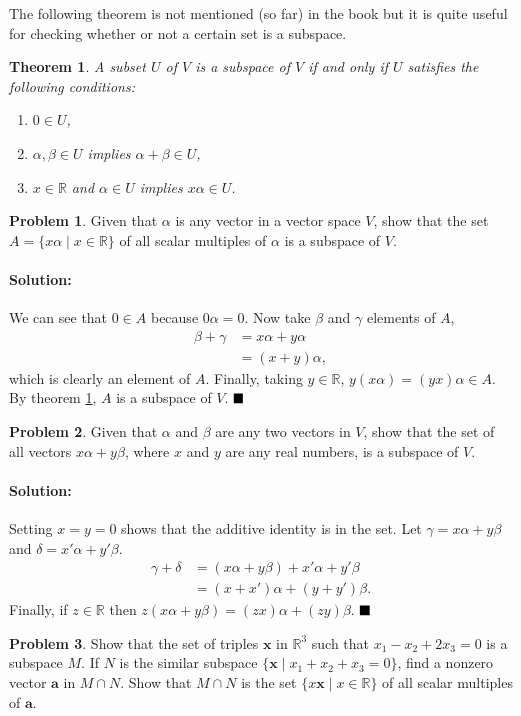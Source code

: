 \documentclass[]{article}
\newcommand{\RR}{\mathbb{R}}
\newtheorem{theorem}{Theorem}[section]
\theoremstyle{definition}
\newtheorem{problem}{Problem}
\newenvironment{solution}{\paragraph{Solution:}}{\hfill$\blacksquare \\$}
\begin{document}
The following theorem is not mentioned (so far) in the book but it is quite useful for checking whether or not a certain set is a subspace.
\begin{theorem}\label{subspace:1}
	A subset $U$ of $V$ is a subspace of $V$ if and only if $U$ satisfies the following conditions:
	\begin{enumerate}
		\item $0 \in U$,
		\item $\alpha, \beta \in U$ implies $\alpha + \beta \in U$,
		\item $x \in \RR$ and $\alpha \in U$ implies $x\alpha \in U$.
	\end{enumerate}
\end{theorem}
\begin{problem}
	Given that $\alpha$ is any vector in a vector space $V$, show that the set $A = \{x\alpha \mid x \in \RR \}$ of all scalar multiples of $\alpha$ is a subspace of $V$.
\end{problem}
\begin{solution}
	We can see that $0 \in A$  because $0 \alpha = 0$. Now take $\beta$ and $\gamma$ elements of $A$, 
	\begin{align*}
		\beta + \gamma &= x \alpha + y \alpha \\ 
		&= (x + y)\alpha,
	\end{align*}
	which is clearly an element of $A$. Finally, taking $y \in \RR$, $y(x\alpha) = (yx) \alpha \in A$.
	By theorem \ref{subspace:1}, $A$ is a subspace of $V$.
\end{solution}
\begin{problem}
	Given that $\alpha$ and $\beta$ are any two vectors in $V$, show that the set of all vectors $x\alpha + y\beta$, where $x$ and $y$ are any real numbers, is a subspace of $V$.
\end{problem}
\begin{solution}
	Setting $x = y = 0$ shows that the additive identity is in the set. Let $\gamma = x\alpha + y\beta$ and $\delta = x'\alpha + y'\beta$.
	\begin{align*}
		\gamma + \delta &= (x\alpha + y\beta) + x'\alpha + y'\beta \\
						&= (x+x')\alpha + (y + y')\beta.
	\end{align*}
	Finally, if $z \in \RR$ then $z(x\alpha + y\beta) = (zx)\alpha + (zy)\beta$.
\end{solution}
\begin{problem}
	Show that the set of triples $\mathbf{x}$ in $\RR^3$ such that $x_1 - x_2 + 2x_3 = 0$ is a subspace $M$. If $N$ is the similar subspace $\{ \mathbf{x} \mid x_1 + x_2 + x_3 = 0 \}$, find a nonzero vector $\textbf{a}$ in $M \cap N$. Show that $M \cap N$ is the set $\{x\mathbf{x} \mid x \in \RR \}$ of all scalar multiples of $\mathbf{a}$.
\end{problem}
\end{document}
